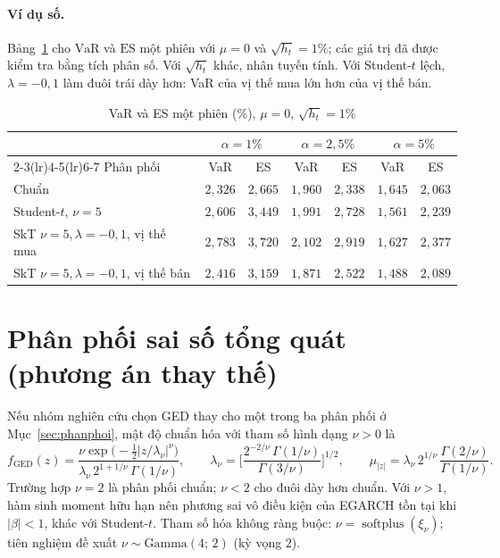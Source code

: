 \documentclass[12pt,a4paper]{article}
\theoremstyle{definition}
\theoremstyle{remark}
\newcommand{\VaR}{\mathrm{VaR}}
\newcommand{\ES}{\mathrm{ES}}
\begin{document}
\paragraph{Ví dụ số.} Bảng~\ref{tab:vidu} cho $\VaR$ và $\ES$ một phiên với $\mu=0$ và $\sqrt{h_t}=1\%$; các giá trị đã được kiểm tra bằng tích phân số. Với $\sqrt{h_t}$ khác, nhân tuyến tính. Với Student-$t$ lệch, $\lambda=-0{,}1$ làm đuôi trái dày hơn: VaR của vị thế mua lớn hơn của vị thế bán.

\begin{table}[h]
\centering
\caption{VaR và ES một phiên (\%), $\mu=0$, $\sqrt{h_t}=1\%$}\label{tab:vidu}
\begin{tabular}{@{}lcccccc@{}}
\toprule
 & \multicolumn{2}{c}{$\alpha=1\%$} & \multicolumn{2}{c}{$\alpha=2{,}5\%$} & \multicolumn{2}{c}{$\alpha=5\%$} \\
\cmidrule(lr){2-3}\cmidrule(lr){4-5}\cmidrule(lr){6-7}
Phân phối & VaR & ES & VaR & ES & VaR & ES \\
\midrule
Chuẩn & $2{,}326$ & $2{,}665$ & $1{,}960$ & $2{,}338$ & $1{,}645$ & $2{,}063$ \\
Student-$t$, $\nu=5$ & $2{,}606$ & $3{,}449$ & $1{,}991$ & $2{,}728$ & $1{,}561$ & $2{,}239$ \\
SkT $\nu=5,\lambda=-0{,}1$, vị thế mua & $2{,}783$ & $3{,}720$ & $2{,}102$ & $2{,}919$ & $1{,}627$ & $2{,}377$ \\
SkT $\nu=5,\lambda=-0{,}1$, vị thế bán & $2{,}416$ & $3{,}159$ & $1{,}871$ & $2{,}522$ & $1{,}488$ & $2{,}089$ \\
\bottomrule
\end{tabular}
\end{table}

\section{Phân phối sai số tổng quát (phương án thay thế)}\label{app:ged}

Nếu nhóm nghiên cứu chọn GED thay cho một trong ba phân phối ở Mục~\ref{sec:phanphoi}, mật độ chuẩn hóa với tham số hình dạng $\nu>0$ là \cite{nelson1991}
\begin{equation}
f_{\mathrm{GED}}(z)=\frac{\nu\exp\!\big(-\tfrac12|z/\lambda_\nu|^{\nu}\big)}{\lambda_\nu\,2^{1+1/\nu}\,\Gamma(1/\nu)},\qquad
\lambda_\nu=\Big[\frac{2^{-2/\nu}\,\Gamma(1/\nu)}{\Gamma(3/\nu)}\Big]^{1/2},\qquad
\mu_{|z|}=\lambda_\nu\,2^{1/\nu}\,\frac{\Gamma(2/\nu)}{\Gamma(1/\nu)} .
\end{equation}
Trường hợp $\nu=2$ là phân phối chuẩn; $\nu<2$ cho đuôi dày hơn chuẩn. Với $\nu>1$, hàm sinh moment hữu hạn nên phương sai vô điều kiện của EGARCH tồn tại khi $|\beta|<1$, khác với Student-$t$. Tham số hóa không ràng buộc: $\nu=\operatorname{softplus}(\xi_\nu)$; tiên nghiệm đề xuất $\nu\sim\mathrm{Gamma}(4;\,2)$ (kỳ vọng $2$).
\end{document}

